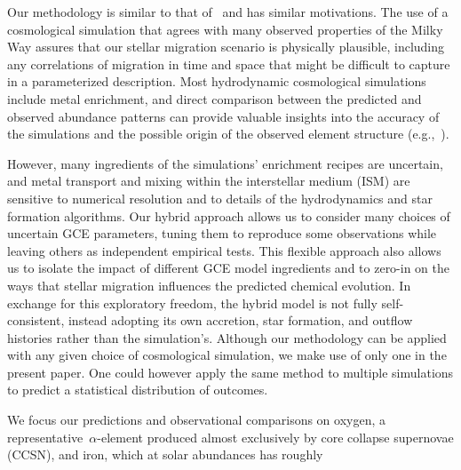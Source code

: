 Our methodology is similar to that of~\citet*{Minchev2013, Minchev2014} and has 
similar motivations. 
The use of a cosmological simulation that agrees with many observed properties 
of the Milky Way assures that our stellar migration scenario is physically 
plausible, including any correlations of migration in time and space that might 
be difficult to capture in a parameterized description. 
Most hydrodynamic cosmological simulations include metal enrichment, and direct 
comparison between the predicted and observed abundance patterns can provide 
valuable insights into the accuracy of the simulations and the possible origin 
of the observed element structure (e.g.,~\citealt{Mackereth2018, Grand2018, 
Buck2020b, Vincenzo2020, Buck2021}). 
\par 
However, many ingredients of the simulations' enrichment recipes are 
uncertain, and metal transport and mixing within the interstellar medium (ISM) 
are sensitive to numerical resolution and to details of the hydrodynamics and 
star formation algorithms. 
Our hybrid approach allows us to consider many 
choices of uncertain GCE parameters, tuning them to reproduce some 
observations while leaving others as independent empirical tests. 
This flexible approach also allows us to isolate the impact of different 
GCE model ingredients and to zero-in on the ways that stellar migration 
influences the predicted chemical evolution. 
In exchange for this exploratory freedom, the hybrid model is not fully 
self-consistent, instead adopting its own accretion, star formation, and 
outflow histories rather than the simulation's. Although our methodology can 
be applied with any given choice of cosmological simulation, we make use of 
only one in the present paper. 
One could however apply the same method to multiple simulations to 
predict a statistical distribution of outcomes. 
\par 
We focus our predictions and observational comparisons on oxygen, a 
representative~$\alpha$-element produced almost exclusively by core 
collapse supernovae (CCSN), and iron, which at solar abundances has roughly 
